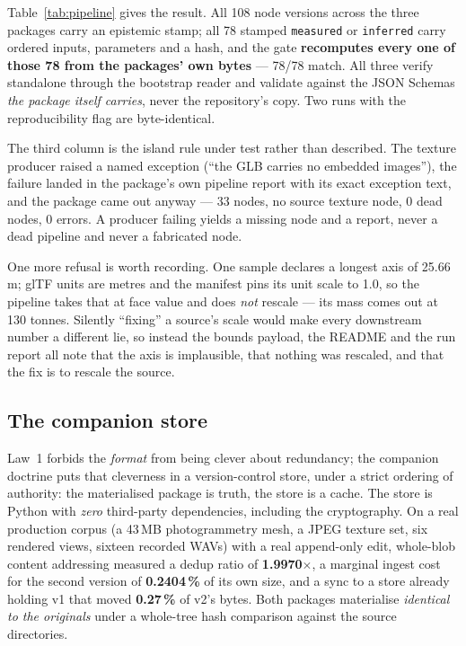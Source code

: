 \documentclass[10pt,twocolumn,letterpaper]{article}
\newcommand{\code}[1]{\texttt{\small #1}}
\begin{document}
Table~\ref{tab:pipeline} gives the result. All 108 node versions across the three
packages carry an epistemic stamp; all 78 stamped \code{measured} or
\code{inferred} carry ordered inputs, parameters and a hash, and the gate
\textbf{recomputes every one of those 78 from the packages' own bytes} ---
78/78 match. All three verify standalone through the bootstrap reader and validate
against the JSON Schemas \emph{the package itself carries}, never the repository's
copy. Two runs with the reproducibility flag are byte-identical.

The third column is the island rule under test rather than described. The texture
producer raised a named exception (``the GLB carries no embedded images''), the
failure landed in the package's own pipeline report with its exact exception text,
and the package came out anyway --- 33 nodes, no source texture node, 0 dead
nodes, 0 errors. A producer failing yields a missing node and a report, never a
dead pipeline and never a fabricated node.

One more refusal is worth recording. One sample declares a longest axis of
25.66\,m; glTF units are metres and the manifest pins its unit scale to 1.0, so the
pipeline takes that at face value and does \emph{not} rescale --- its mass comes
out at 130 tonnes. Silently ``fixing'' a source's scale would make every downstream
number a different lie, so instead the bounds payload, the README and the run
report all note that the axis is implausible, that nothing was rescaled, and that
the fix is to rescale the source.

\subsection{The companion store}
\label{sec:store}

Law~1 forbids the \emph{format} from being clever about redundancy; the companion
doctrine puts that cleverness in a version-control store, under a strict ordering
of authority: the materialised package is truth, the store is a cache. The store
is Python with \emph{zero} third-party dependencies, including the cryptography.
On a real production corpus (a 43\,MB photogrammetry mesh, a JPEG texture set, six
rendered views, sixteen recorded WAVs) with a real append-only edit, whole-blob
content addressing measured a dedup ratio of \textbf{1.9970$\times$}, a marginal
ingest cost for the second version of \textbf{0.2404\,\%} of its own size, and a
sync to a store already holding v1 that moved \textbf{0.27\,\%} of v2's bytes.
Both packages materialise \emph{identical to the originals} under a whole-tree
hash comparison against the source directories.
\end{document}
